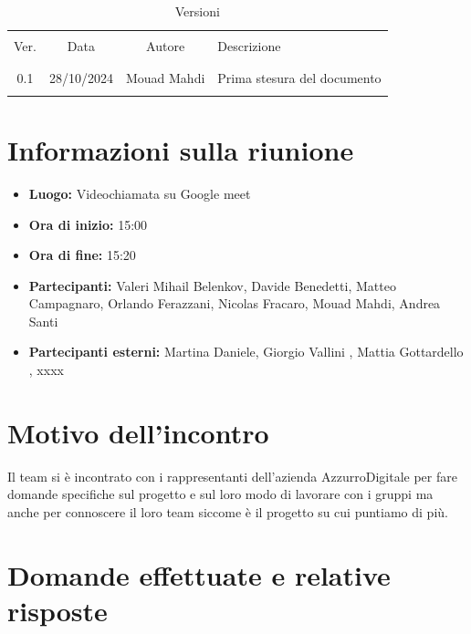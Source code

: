 \documentclass[italian, 12pt]{article}
\begin{document}
\pagestyle{mystyle}


\begin{table}[!h]
	\caption{Versioni}
	\begin{center}
		\begin{tabular}{ c c c p{9cm}}
			\hline \\[-2ex]
			Ver. & Data & Autore & Descrizione \\
			\\[-2ex] \hline \\[-1.5ex]

			0.1 & 28/10/2024 & Mouad Mahdi & Prima stesura del documento\\
			\\[-1.5ex] \hline
		\end{tabular}
	\end{center}
\end{table}


\tableofcontents
\newpage


\section{Informazioni sulla riunione}
\begin{itemize}
    \item \textbf{Luogo:} Videochiamata su Google meet
    \item \textbf{Ora di inizio:} 15:00
    \item \textbf{Ora di fine:} 15:20
    \item \textbf{Partecipanti:} Valeri Mihail Belenkov, Davide Benedetti, Matteo Campagnaro, Orlando Ferazzani, Nicolas Fracaro, Mouad Mahdi, Andrea Santi 
    \item \textbf{Partecipanti esterni:} Martina Daniele, Giorgio Vallini , Mattia Gottardello , xxxx
\end{itemize}

\section{Motivo dell'incontro}
Il team si è incontrato con i rappresentanti dell'azienda AzzurroDigitale per fare domande specifiche sul progetto e sul loro modo di lavorare con i gruppi ma anche per connoscere il loro team siccome è il progetto su cui puntiamo di più.

\section{Domande effettuate e relative risposte}
\end{document}
